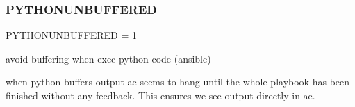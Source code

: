 \subsubsection{\texorpdfstring{P\+Y\+T\+H\+O\+N\+U\+N\+B\+U\+F\+F\+E\+R\+ED}{PYTHONUNBUFFERED}}
{\footnotesize\ttfamily P\+Y\+T\+H\+O\+N\+U\+N\+B\+U\+F\+F\+E\+R\+ED = 1}



avoid buffering when exec python code (ansible) 

when python buffers output ae seems to hang until the whole playbook has been finished without any feedback. This ensures we see output directly in ae. 